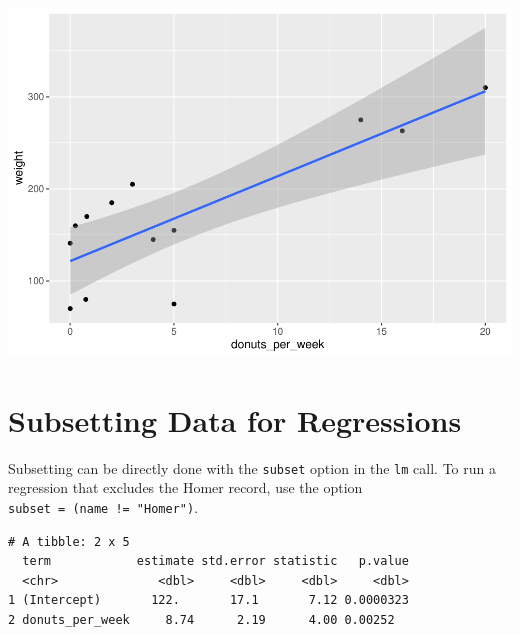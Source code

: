 \documentclass[]{book}
\newenvironment{Shaded}{\begin{snugshade}}{\end{snugshade}}
\newcommand{\DataTypeTok}[1]{\textcolor[rgb]{0.13,0.29,0.53}{#1}}
\newcommand{\KeywordTok}[1]{\textcolor[rgb]{0.13,0.29,0.53}{\textbf{#1}}}
\newcommand{\NormalTok}[1]{#1}
\newcommand{\OperatorTok}[1]{\textcolor[rgb]{0.81,0.36,0.00}{\textbf{#1}}}
\newcommand{\StringTok}[1]{\textcolor[rgb]{0.31,0.60,0.02}{#1}}
\begin{document}
\includegraphics{bailey_files/figure-latex/unnamed-chunk-37-1.pdf}

\hypertarget{subsetting-data-for-regressions}{%
\section{Subsetting Data for Regressions}\label{subsetting-data-for-regressions}}

Subsetting can be directly done with the \texttt{subset} option in the \texttt{lm} call. To run a regression that excludes the Homer record, use the option \texttt{subset\ =\ (name\ !=\ "Homer")}.

\begin{Shaded}
\end{Shaded}

\begin{verbatim}
# A tibble: 2 x 5
  term            estimate std.error statistic   p.value
  <chr>              <dbl>     <dbl>     <dbl>     <dbl>
1 (Intercept)       122.       17.1       7.12 0.0000323
2 donuts_per_week     8.74      2.19      4.00 0.00252  
\end{verbatim}
\end{document}
